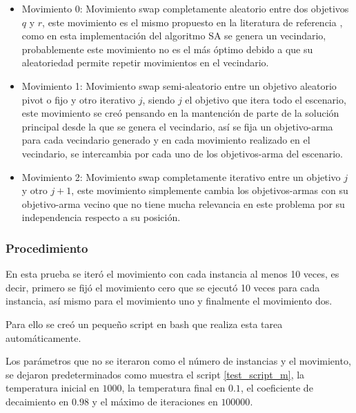 \begin{itemize}
    \item Movimiento 0: Movimiento swap completamente aleatorio entre dos objetivos $q$ y $r$, este movimiento es el mismo propuesto en la literatura de referencia \cite{sonuc-2017}, como en esta implementación del algoritmo SA se genera un vecindario, probablemente este movimiento no es el más óptimo debido a que su aleatoriedad permite repetir movimientos en el vecindario.
    
    \item Movimiento 1: Movimiento swap semi-aleatorio entre un objetivo aleatorio pivot o fijo y otro iterativo $j$, siendo $j$ el objetivo que itera todo el escenario, este movimiento se creó pensando en la mantención de parte de la solución principal desde la que se genera el vecindario, así se fija un objetivo-arma para cada vecindario generado y en cada movimiento realizado en el vecindario, se intercambia por cada uno de los objetivos-arma del escenario.
    
    \item Movimiento 2: Movimiento swap completamente iterativo entre un objetivo $j$ y otro $j+1$, este movimiento simplemente cambia los objetivos-armas con su objetivo-arma vecino que no tiene mucha relevancia en este problema por su independencia respecto a su posición.
\end{itemize}

\subsubsection{Procedimiento}

En esta prueba se iteró el movimiento con cada instancia al menos 10 veces, es decir, primero se fijó el movimiento cero que se ejecutó 10 veces para cada instancia, así mismo para el movimiento uno y finalmente el movimiento dos.

Para ello se creó un pequeño script en bash que realiza esta tarea automáticamente.

Los parámetros que no se iteraron como el número de instancias y el movimiento, se dejaron predeterminados como muestra el script \ref{test_script_m}, la temperatura inicial en $1000$, la temperatura final en $0.1$, el coeficiente de decaimiento en $0.98$ y el máximo de iteraciones en $100000$.




